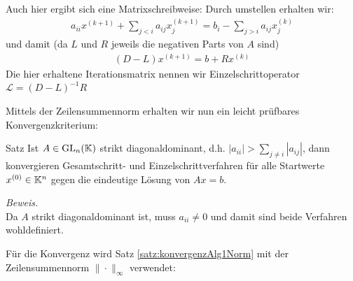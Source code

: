 Auch hier ergibt sich eine Matrixschreibweise: Durch umstellen erhalten wir:
%
\begin{align*}
  a_{ii}x^{(k+1)} + \sum_{j<i} a_{ij}x_j^{(k+1)} = b_i - \sum_{j>i}a_{ij}x_j^{(k)}
\end{align*}
%
und damit (da $L$ und $R$ jeweils die negativen Parts von $A$ sind)
%
\begin{align*}
  (D-L)x^{(k+1)} = b + Rx^{(k)}
\end{align*}
%
Die hier erhaltene Iterationsmatrix nennen wir Einzelschrittoperator $\mathcal{L}=(D-L)^{-1}R$

Mittels der Zeilensummennorm erhalten wir nun ein leicht prüfbares Konvergenzkriterium:

\begin{colbox}{Satz}
  Ist $A\in\text{GL}_n(\mathbb K)$ strikt diagonaldominant, d.h. $|a_{ii}| > \sum_{j\neq i} |a_{ij}|$, 
  dann konvergieren Gesamtschritt- und Einzelschrittverfahren für alle Startwerte $x^{(0)}\in\mathbb K^n$ gegen 
  die eindeutige Lösung von $Ax=b$.
\end{colbox}

\textit{Beweis.} \\
Da $A$ strikt diagonaldominant ist, muss $a_{ii} \neq 0$ und damit sind beide Verfahren wohldefiniert.

Für die Konvergenz wird Satz \ref{satz:konvergenzAlg1Norm} mit der Zeilensummennorm $\|\cdot\|_\infty$ verwendet:

